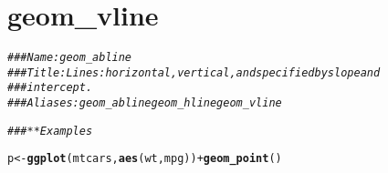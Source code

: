 \documentclass[a4paper,titlepage]{tufte-handout}\usepackage[]{graphicx}\usepackage[]{color}
\makeatletter
\newcommand{\hlcom}[1]{\textcolor[rgb]{0.678,0.584,0.686}{\textit{#1}}}%
\newcommand{\hlopt}[1]{\textcolor[rgb]{0,0,0}{#1}}%
\newcommand{\hlstd}[1]{\textcolor[rgb]{0.345,0.345,0.345}{#1}}%
\newcommand{\hlkwb}[1]{\textcolor[rgb]{0.69,0.353,0.396}{#1}}%
\newcommand{\hlkwd}[1]{\textcolor[rgb]{0.737,0.353,0.396}{\textbf{#1}}}%
\newenvironment{kframe}{%
 \def\at@end@of@kframe{}%
 \ifinner\ifhmode%
  \def\at@end@of@kframe{\end{minipage}}%
  \begin{minipage}{\columnwidth}%
 \fi\fi%
 \def\FrameCommand##1{\hskip\@totalleftmargin \hskip-\fboxsep
 \colorbox{shadecolor}{##1}\hskip-\fboxsep
     \hskip-\linewidth \hskip-\@totalleftmargin \hskip\columnwidth}%
 \MakeFramed {\advance\hsize-\width
   \@totalleftmargin\z@ \linewidth\hsize
   \@setminipage}}%
 {\par\unskip\endMakeFramed%
 \at@end@of@kframe}
\newenvironment{knitrout}{}{} %
\makeatother
\begin{document}
\section{geom\_vline}

\begin{knitrout}
\color{fgcolor}\begin{kframe}
\begin{alltt}
\hlcom{### Name: geom_abline}
\hlcom{### Title: Lines: horizontal, vertical, and specified by slope and}
\hlcom{###   intercept.}
\hlcom{### Aliases: geom_abline geom_hline geom_vline}

\hlcom{### ** Examples}

\hlstd{p} \hlkwb{<-} \hlkwd{ggplot}\hlstd{(mtcars,} \hlkwd{aes}\hlstd{(wt, mpg))} \hlopt{+} \hlkwd{geom_point}\hlstd{()}


\end{alltt}
\end{kframe}
\end{knitrout}
\end{document}
